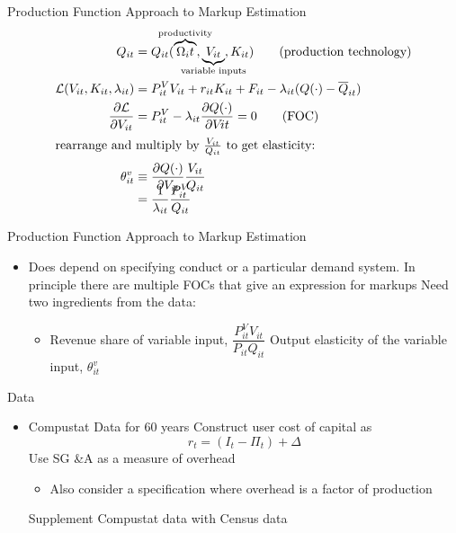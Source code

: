 \documentclass{beamer}
\begin{document}
\begin{frame}{Production Function Approach to Markup Estimation}
\setlength{\jot}{20pt}
  \begin{align*}
    Q_{it} &= Q_{it}(\overbrace{\Omega_it}^{\mathclap{\text{productivity}}},\underbrace{V_{it}}_{\mathclap{\text{variable inputs}}}, K_{it}) \tag{production technology}\\
    \mathcal{L}(V_{it}, K_{it}, \lambda_{it}) &= P^V_{it}V_{it} + r_{it}K_{it} + F_{it} - \lambda_{it}(Q(\cdot) - \overline{Q}_{it})\\
    \frac{\partial \mathcal{L}}{\partial V_{it}} &= P_{it}^V - \lambda_{it} \frac{\partial Q(\cdot)}{\partial V_{}it} = 0 \tag{FOC}\\    \intertext{rearrange and multiply by $\frac{V_{it}}{Q_{it}}$ to get elasticity:}
    \theta_{it}^v &\equiv \frac{\partial Q(\cdot)}{\partial V_{it}}\frac{V_{it}}{Q_{it}}\\[-10pt]
    &= \frac{1}{\lambda_{it}} \frac{P_{it}^V}{Q_{it}}
  \end{align*}
\end{frame}
%
\begin{frame}{Production Function Approach to Markup Estimation}
  \begin{itemize}
  \item Does  depend on specifying conduct or a particular demand system.
    \vitem In principle there are multiple FOCs that give an expression for markups
    \vitem Need two ingredients from the data:
    \begin{itemize}
    \item Revenue share of variable input, $\dfrac{P_{it}^V V_{it}}{P_{it}Q_{it}}$
      \vitem Output elasticity of the variable input, $\theta^v_{it}$
    \end{itemize}
  \end{itemize}
  \end{frame}
  \begin{frame}{Data}
    \begin{itemize}
    \item Compustat Data for 60 years
      \vitem Construct user cost of capital as
      \[
r_t = (I_t - \Pi_t) + \Delta
      \]
      \vitem Use SG \&A as a measure of overhead
      \begin{itemize}
      \item Also consider a specification where overhead is a factor of production
      \end{itemize}
      \vitem Supplement Compustat data with Census data
    \end{itemize}
  \end{frame}
\end{document}
